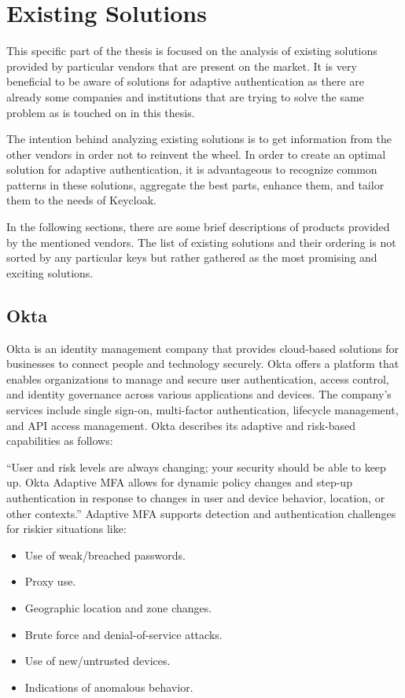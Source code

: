 \chapter{Existing Solutions}

This specific part of the thesis is focused on the analysis of existing solutions provided by particular vendors that are present on the market.
It is very beneficial to be aware of solutions for adaptive authentication as there are already some companies and institutions that are trying to solve the same problem as is touched on in this thesis.

The intention behind analyzing existing solutions is to get information from the other vendors in order not to reinvent the wheel.
In order to create an optimal solution for adaptive authentication, it is advantageous to recognize common patterns in these solutions, aggregate the best parts, enhance them, and tailor them to the needs of Keycloak. 

In the following sections, there are some brief descriptions of products provided by the mentioned vendors.
The list of existing solutions and their ordering is not sorted by any particular keys but rather gathered as the most promising and exciting solutions.

\newpage
\section{Okta}

Okta is an identity management company that provides cloud-based solutions for businesses to connect people and technology securely.
Okta offers a platform that enables organizations to manage and secure user authentication, access control, and identity governance across various applications and devices.
The company's services include single sign-on, multi-factor authentication, lifecycle management, and API access management.
Okta describes its adaptive and risk-based capabilities as follows:

``User and risk levels are always changing; your security should be able to keep up.
Okta Adaptive MFA allows for dynamic policy changes and step-up authentication in response to changes in user and device behavior, location, or other contexts.''\cite{existing-okta}
\newline
\newline
Adaptive MFA supports detection and authentication challenges for riskier situations like:

\begin{itemize}
    \item Use of weak/breached passwords.
    \item Proxy use.
    \item Geographic location and zone changes.
    \item Brute force and denial-of-service attacks.
    \item Use of new/untrusted devices.
    \item Indications of anomalous behavior. 
\end{itemize}

